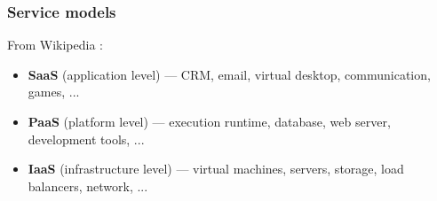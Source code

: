 \subsubsection{Service models}

From Wikipedia \cite{wikipedia_cloud_computing}:
\begin{itemize}
	\item \textbf{SaaS} (application level) --- CRM, email, virtual desktop, communication, games, ...
	\item \textbf{PaaS} (platform level) --- execution runtime, database, web server, development tools, ...
	\item \textbf{IaaS} (infrastructure level) --- virtual machines, servers, storage, load balancers, network, ...
\end{itemize}